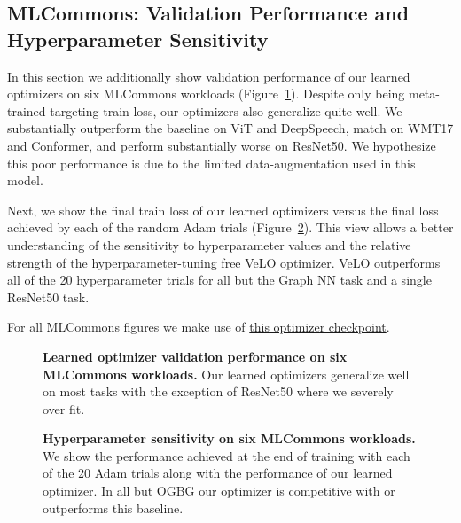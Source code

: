 \documentclass[11pt]{article}
\begin{document}
\subsection{MLCommons: Validation Performance and Hyperparameter Sensitivity} \label{app:extended_mlcommons}
In this section we additionally show validation performance of our learned optimizers on six MLCommons workloads (Figure~\ref{fig:init2winit_valid}).
Despite only being meta-trained targeting train loss, our optimizers also generalize quite well.
We substantially outperform the baseline on ViT and DeepSpeech, match on WMT17 and Conformer, and perform substantially worse on ResNet50.
We hypothesize this poor performance is due to the limited data-augmentation used in this model.

Next, we show the final train loss of our learned optimizers versus the final loss achieved by each of the random Adam trials (Figure~\ref{fig:init2winit_train_hparams}).
This view allows a better understanding of the sensitivity to hyperparameter values and the relative strength of the hyperparameter-tuning free VeLO optimizer.
VeLO outperforms all of the 20 hyperparameter trials for all but the Graph NN task and a single ResNet50 task.

For all MLCommons figures we make use of \href{https://github.com/google/learned_optimization/blob/b1d8267c5e513a4112e7422b98bacc16e1f0e844/learned_optimization/research/general_lopt/pretrained_optimizers.py#L108}{this optimizer checkpoint}.

\begin{figure}[t!]
    \centering
    \caption{\textbf{Learned optimizer validation performance on six MLCommons workloads.} Our learned optimizers generalize well on most tasks with the exception of ResNet50 where we severely over fit. 
    \label{fig:init2winit_valid}
    }
\end{figure}


\begin{figure}[t!]
    \centering
    \caption{\textbf{Hyperparameter sensitivity on six MLCommons workloads.} We show the performance achieved at the end of training with each of the 20 Adam trials along with the performance of our learned optimizer. In all but OGBG our optimizer is competitive with or outperforms this baseline.
    \label{fig:init2winit_train_hparams}
    }
\end{figure}
\end{document}
